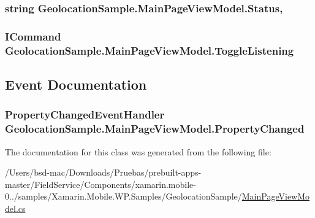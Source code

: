 \hypertarget{class_geolocation_sample_1_1_main_page_view_model_ac8fa387c6811dca5ed7af6f78d25c241}{
\subsubsection[{Status}]{\setlength{\rightskip}{0pt plus 5cm}string Geolocation\+Sample.\+Main\+Page\+View\+Model.\+Status\hspace{0.3cm}{\ttfamily [get]}, {\ttfamily [set]}}}\label{class_geolocation_sample_1_1_main_page_view_model_ac8fa387c6811dca5ed7af6f78d25c241}
\hypertarget{class_geolocation_sample_1_1_main_page_view_model_ad7f76b80c25153377754e616e8ff1a61}{
\subsubsection[{Toggle\+Listening}]{\setlength{\rightskip}{0pt plus 5cm}I\+Command Geolocation\+Sample.\+Main\+Page\+View\+Model.\+Toggle\+Listening\hspace{0.3cm}{\ttfamily [get]}}}\label{class_geolocation_sample_1_1_main_page_view_model_ad7f76b80c25153377754e616e8ff1a61}


\subsection{Event Documentation}
\hypertarget{class_geolocation_sample_1_1_main_page_view_model_af5ec22b2b5b6eb455e14117617e25428}{
\subsubsection[{Property\+Changed}]{\setlength{\rightskip}{0pt plus 5cm}Property\+Changed\+Event\+Handler Geolocation\+Sample.\+Main\+Page\+View\+Model.\+Property\+Changed}}\label{class_geolocation_sample_1_1_main_page_view_model_af5ec22b2b5b6eb455e14117617e25428}


The documentation for this class was generated from the following file\+:\begin{DoxyCompactItemize}
\item 
/\+Users/bsd-\/mac/\+Downloads/\+Pruebas/prebuilt-\/apps-\/master/\+Field\+Service/\+Components/xamarin.\+mobile-\/0../samples/\+Xamarin.\+Mobile.\+W\+P.\+Samples/\+Geolocation\+Sample/\hyperlink{_geolocation_sample_2_main_page_view_model_8cs}{Main\+Page\+View\+Model.\+cs}\end{DoxyCompactItemize}
